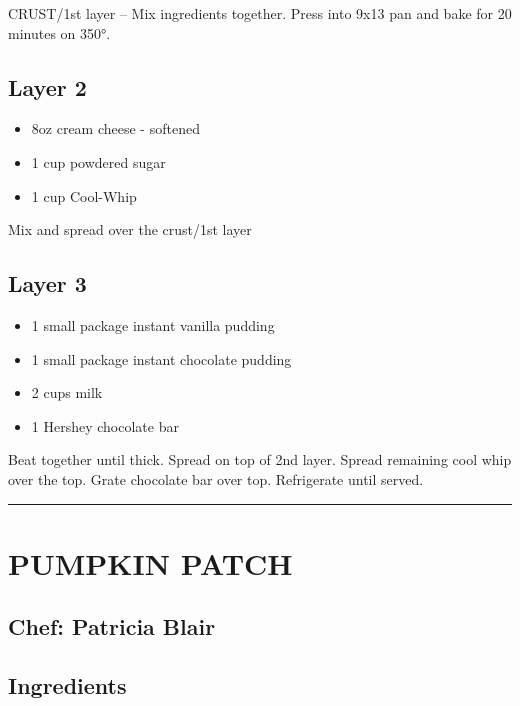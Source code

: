 \documentclass[
]{book}
\providecommand{\tightlist}{%
  \setlength{\itemsep}{0pt}\setlength{\parskip}{0pt}}
\begin{document}
CRUST/1st layer -- Mix ingredients together. Press into 9x13 pan and bake for 20 minutes on 350°.

\hypertarget{layer-2}{%
\subsection*{Layer 2}\label{layer-2}}


\begin{itemize}
\tightlist
\item
  8oz cream cheese - softened
\item
  1 cup powdered sugar
\item
  1 cup Cool-Whip
\end{itemize}

Mix and spread over the crust/1st layer

\hypertarget{layer-3}{%
\subsection*{Layer 3}\label{layer-3}}


\begin{itemize}
\tightlist
\item
  1 small package instant vanilla pudding
\item
  1 small package instant chocolate pudding
\item
  2 cups milk
\item
  1 Hershey chocolate bar
\end{itemize}

Beat together until thick. Spread on top of 2nd layer. Spread remaining cool whip over the top. Grate chocolate bar over top. Refrigerate until served.

\begin{center}\rule{0.5\linewidth}{0.5pt}\end{center}

\hypertarget{pumpkin-patch}{%
\section*{PUMPKIN PATCH}\label{pumpkin-patch}}


\hypertarget{chef-patricia-blair-15}{%
\subsection*{Chef: Patricia Blair}\label{chef-patricia-blair-15}}


\hypertarget{ingredients-87}{%
\subsection*{Ingredients}\label{ingredients-87}}
\end{document}
